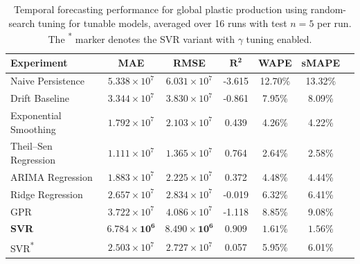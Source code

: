 \begin{table}[!ht]
	\centering
	\caption{\centering Temporal forecasting performance for global plastic production using random-search tuning for tunable models, averaged over 16 runs with test \(n=5\) per run. The \textsuperscript{*} marker denotes the SVR variant with \(\gamma\) tuning enabled.}
	\begin{tabular}{@{}lcccccc@{}}
		\toprule
		\textbf{Experiment}    & \textbf{MAE}                   & \textbf{RMSE}                  & $\mathbf{R^2}$     & \textbf{WAPE}       & \textbf{sMAPE}      \\
		\midrule
		Naive Persistence      & \(5.338 \times 10^7\)          & \(6.031 \times 10^7\)          & -3.615             & 12.70\%             & 13.32\%             \\
		Drift Baseline         & \(3.344 \times 10^7\)          & \(3.830 \times 10^7\)          & -0.861             & 7.95\%              & 8.09\%              \\
		Exponential Smoothing  & \(1.792 \times 10^7\)          & \(2.103 \times 10^7\)          & 0.439              & 4.26\%              & 4.22\%              \\
		Theil--Sen Regression  & \(1.111 \times 10^7\)          & \(1.365 \times 10^7\)          & 0.764              & 2.64\%              & 2.58\%              \\
		ARIMA Regression       & \(1.883 \times 10^7\)          & \(2.225 \times 10^7\)          & 0.372              & 4.48\%              & 4.44\%              \\
		Ridge Regression       & \(2.657 \times 10^7\)          & \(2.834 \times 10^7\)          & -0.019             & 6.32\%              & 6.41\%              \\
		GPR                    & \(3.722 \times 10^7\)          & \(4.086 \times 10^7\)          & -1.118             & 8.85\%              & 9.08\%              \\
		\textbf{SVR}           & \(\mathbf{6.784 \times 10^6}\) & \(\mathbf{8.490 \times 10^6}\) & \(\mathbf{0.909}\) & \(\mathbf{1.61}\)\% & \(\mathbf{1.56}\)\% \\
		SVR\textsuperscript{*} & \(2.503 \times 10^7\)          & \(2.727 \times 10^7\)          & 0.057              & 5.95\%              & 6.01\%              \\
		\hline
	\end{tabular}
	\label{tab:global_forecasting_random_search_metrics}
\end{table}
